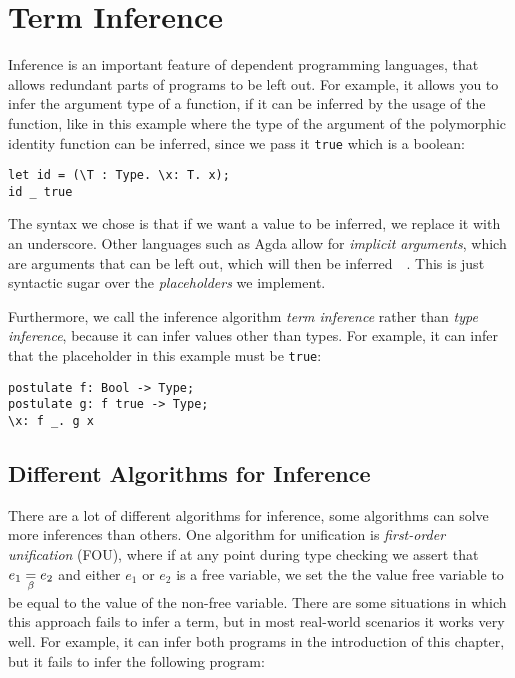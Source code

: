 \chapter{Term Inference}
\label{ch:inference}

Inference is an important feature of dependent programming languages, that allows redundant parts of programs to be left out. For example, it allows you to infer the argument type of a function, if it can be inferred by the usage of the function, like in this example where the type of the argument of the polymorphic identity function can be inferred, since we pass it \verb|true| which is a boolean:
\begin{lstlisting}
let id = (\T : Type. \x: T. x);
id _ true
\end{lstlisting}

The syntax we chose is that if we want a value to be inferred, we replace it with an underscore. Other languages such as Agda allow for \emph{implicit arguments}, which are arguments that can be left out, which will then be inferred~\cite{agda}~\cite{coq}. This is just syntactic sugar over the \emph{placeholders} we implement.

Furthermore, we call the inference algorithm \emph{term inference} rather than \emph{type inference}, because it can infer values other than types. For example, it can infer that the placeholder in this example must be \verb|true|:
\begin{lstlisting}
postulate f: Bool -> Type;
postulate g: f true -> Type;
\x: f _. g x
\end{lstlisting}

\section{Different Algorithms for Inference}
\label{strength-inference}

There are a lot of different algorithms for inference\cite{typeinference}, some algorithms can solve more inferences than others. One algorithm for unification is \emph{first-order unification} (FOU), where if at any point during type checking we assert that $e_1 \underset{\beta}{=} e_2$ and either $e_1$ or $e_2$ is a free variable, we set the the value free variable to be equal to the value of the non-free variable. There are some situations in which this approach fails to infer a term, but in most real-world scenarios it works very well. For example, it can infer both programs in the introduction of this chapter, but it fails to infer the following program:

